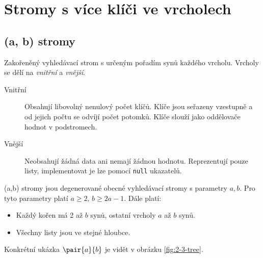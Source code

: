 \section{Stromy s více klíči ve vrcholech}

\subsection{(a, b) stromy}

Zakořeněný vyhledávací strom s určeným pořadím synů každého vrcholu.
Vrcholy se dělí na \textit{vnitřní} a \textit{vnější}.

\begin{description}
    \item[Vnitřní] Obsahují libovolný nenulový počet klíčů.
    Klíče jsou seřazeny vzestupně a od jejich počtu se odvíjí počet potomků.
    Klíče slouží jako oddělovače hodnot v podstromech.
    \item[Vnější] Neobsahují žádná data ani nemají žádnou hodnotu.
    Reprezentují pouze listy, implementovat je lze pomocí \texttt{null} ukazatelů.
\end{description}

(a,b) stromy jsou degenerované obecné vyhledávací stromy s parametry $a, b$.
Pro tyto parametry platí $a \geq 2$, $b \geq 2a - 1$.
Dále platí:

\begin{itemize}
    \item Každý kořen má 2 až $b$ synů, ostatní vrcholy $a$ až $b$ synů.
    \item Všechny listy jsou ve stejné hloubce.
\end{itemize}

Konkrétní ukázka $\pair{a}{b}$ je vidět v obrázku \ref{fig:2-3-tree}.


